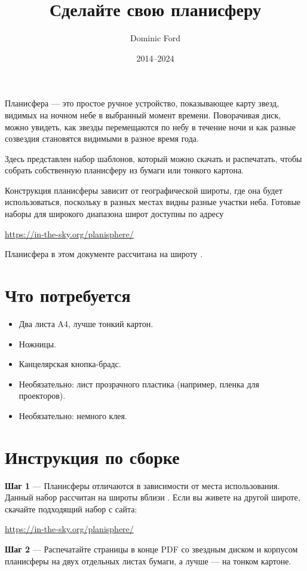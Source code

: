 \documentclass[a4paper,onecolumn,10pt]{article}
\title{Сделайте свою планисферу}
\author{Dominic Ford}
\date{2014--2024}
\begin{document}
\maketitle
\setcounter{footnote}{1}

Планисфера --- это простое ручное устройство, показывающее карту звезд,
видимых на ночном небе в выбранный момент времени. Поворачивая диск,
можно увидеть, как звезды перемещаются по небу в течение ночи и как
разные созвездия становятся видимыми в разное время года.

Здесь представлен набор шаблонов, который можно скачать и распечатать,
чтобы собрать собственную планисферу из бумаги или тонкого картона.

Конструкция планисферы зависит от географической широты, где она будет
использоваться, поскольку в разных местах видны разные участки неба.
Готовые наборы для широкого диапазона широт доступны по адресу

\url{https://in-the-sky.org/planisphere/}

Планисфера в этом документе рассчитана на широту
.

\section*{Что потребуется}

\begin{itemize}
\item Два листа A4, лучше тонкий картон.
\item Ножницы.
\item Канцелярская кнопка-брадс.
\item Необязательно: лист прозрачного пластика (например, пленка для проекторов).
\item Необязательно: немного клея.
\end{itemize}

\section*{Инструкция по сборке}

{\bf Шаг 1} --- Планисферы отличаются в зависимости от места использования.
Данный набор рассчитан на широты вблизи . Если вы живете
на другой широте, скачайте подходящий набор с сайта:

\url{https://in-the-sky.org/planisphere/}

{\bf Шаг 2} --- Распечатайте страницы в конце PDF со звездным диском и
корпусом планисферы на двух отдельных листах бумаги, а лучше --- на тонком
картоне.
\end{document}

